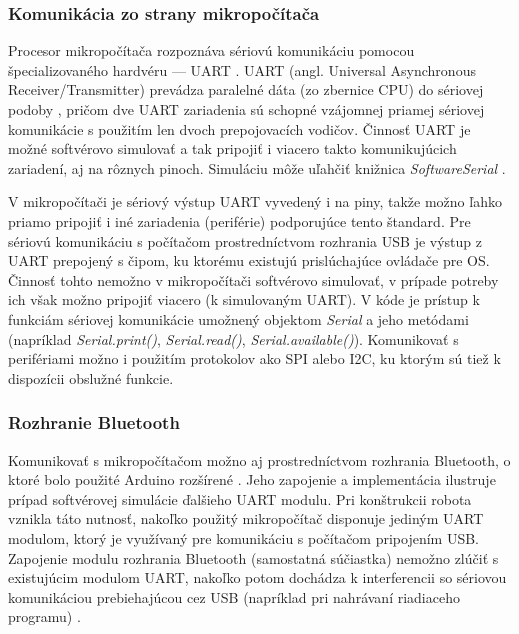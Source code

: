 \subsubsection{Komunikácia zo strany mikropočítača}
Procesor mikropočítača rozpoznáva sériovú komunikáciu pomocou špecializovaného hardvéru --- UART \cite{sketchUpload}. UART (angl. Universal Asynchronous Receiver/Transmitter) prevádza paralelné dáta (zo zbernice CPU) do sériovej podoby \cite{uart}, pričom dve UART zariadenia sú schopné vzájomnej priamej sériovej komunikácie s použitím len dvoch prepojovacích vodičov. Činnosť UART je možné softvérovo simulovať a tak pripojiť i viacero takto komunikujúcich zariadení, aj na rôznych pinoch. Simuláciu môže uľahčiť knižnica \textit{SoftwareSerial} \cite{arduinoSoftwareSerial}.

V mikropočítači je sériový výstup UART vyvedený i na piny, takže možno ľahko priamo pripojiť i iné zariadenia (periférie) podporujúce tento štandard. Pre sériovú komunikáciu s počítačom prostredníctvom rozhrania USB je výstup z UART prepojený s  čipom, ku ktorému existujú prislúchajúce ovládače pre OS. Činnosť tohto  nemožno v mikropočítači softvérovo simulovať, v prípade potreby ich však možno pripojiť viacero (k simulovaným UART). V kóde je prístup k funkciám sériovej komunikácie umožnený objektom \textit{Serial} a jeho metódami (napríklad \textit{Serial.print()}, \textit{Serial.read()}, \textit{Serial.available()}). Komunikovať s perifériami možno i použitím protokolov ako SPI alebo I2C, ku ktorým sú tiež k dispozícii obslužné funkcie.

\subsubsection{Rozhranie Bluetooth}
Komunikovať s mikropočítačom možno aj prostredníctvom rozhrania Bluetooth, o ktoré bolo použité Arduino rozšírené \cite{PetrovicVaskoOtto}. Jeho zapojenie a implementácia ilustruje prípad softvérovej simulácie ďalšieho UART modulu. Pri konštrukcii robota vznikla táto nutnosť, nakoľko použitý mikropočítač disponuje jediným UART modulom, ktorý je využívaný pre komunikáciu s počítačom pripojením USB. Zapojenie modulu rozhrania Bluetooth (samostatná súčiastka) nemožno zlúčiť s existujúcim modulom UART, nakoľko potom dochádza k interferencii so sériovou komunikáciou prebiehajúcou cez USB (napríklad pri nahrávaní riadiaceho programu) \cite{PetrovicVaskoOtto}.


